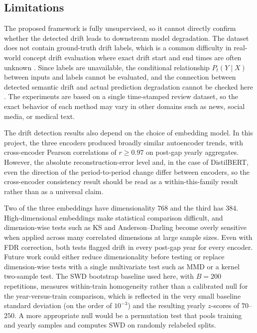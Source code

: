 \documentclass[conference]{IEEEtran}
\begin{document}
\subsection{Limitations}
\label{sec:limitation}

The proposed framework is fully unsupervised, so it cannot directly confirm whether the detected drift leads to downstream model degradation. The dataset does not contain ground-truth drift labels, which is a common difficulty in real-world concept drift evaluation where exact drift start and end times are often unknown \cite{lu2018}. Since labels are unavailable, the conditional relationship $P_t(Y \mid X)$ between inputs and labels cannot be evaluated, and the connection between detected semantic drift and actual prediction degradation cannot be checked here \cite{bayram2022}. The experiments are based on a single time-stamped review dataset, so the exact behavior of each method may vary in other domains such as news, social media, or medical text.

The drift detection results also depend on the choice of embedding model. In this project, the three encoders produced broadly similar autoencoder trends, with cross-encoder Pearson correlations of $r \geq 0.97$ on post-gap yearly aggregates. However, the absolute reconstruction-error level and, in the case of DistilBERT, even the direction of the period-to-period change differ between encoders, so the cross-encoder consistency result should be read as a within-this-family result rather than as a universal claim.

Two of the three embeddings have dimensionality $768$ and the third has $384$. High-dimensional embeddings make statistical comparison difficult, and dimension-wise tests such as KS and Anderson--Darling become overly sensitive when applied across many correlated dimensions at large sample sizes. Even with FDR correction, both tests flagged drift in every post-gap year for every encoder. Future work could either reduce dimensionality before testing or replace dimension-wise tests with a single multivariate test such as MMD \cite{gretton2012} or a kernel two-sample test. The SWD bootstrap baseline used here, with $B = 200$ repetitions, measures within-train homogeneity rather than a calibrated null for the year-versus-train comparison, which is reflected in the very small baseline standard deviation (on the order of $10^{-3}$) and the resulting yearly $z$-scores of $70$--$250$. A more appropriate null would be a permutation test that pools training and yearly samples and computes SWD on randomly relabeled splits.
\end{document}
